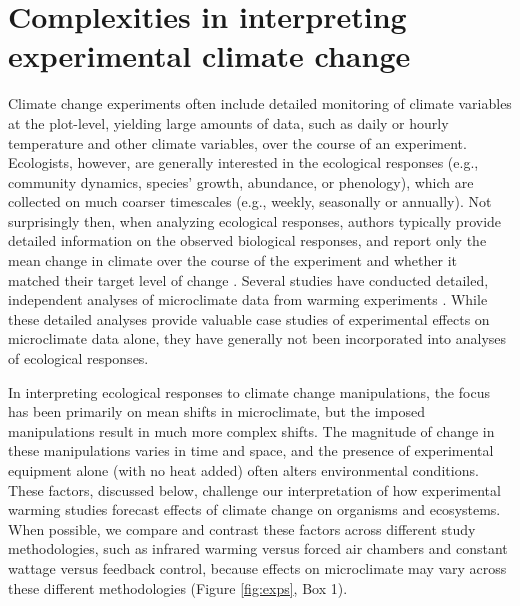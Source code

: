 \documentclass{article}
\begin{document}
\section* {Complexities in interpreting experimental climate change} 
Climate change experiments often include detailed monitoring of climate variables at the plot-level, yielding large amounts of data, such as daily or hourly temperature and other climate variables, over the course of an experiment. Ecologists, however, are generally interested in the ecological responses (e.g., community dynamics, species' growth, abundance, or phenology), which are collected on much coarser timescales (e.g., weekly, seasonally or annually). Not surprisingly then, when analyzing ecological responses, authors typically provide detailed information on the observed biological responses, and report only the mean change in climate over the course of the experiment and whether it matched their target level of change \citep[e.g.,][]{price1998,rollinson2012,clark2014a,clark2014b}. Several studies have conducted detailed, independent analyses of microclimate data from warming experiments \citep[e.g.,][]{harte1995b,kimball2005,kimball2008,mcdaniel2014, pelini2011}. While these detailed analyses provide valuable case studies of experimental effects on microclimate data alone, they have generally not been incorporated into analyses of ecological responses. 

\par In interpreting ecological responses to climate change manipulations, the focus has been primarily on mean shifts in microclimate, but the imposed manipulations result in much more complex shifts. The magnitude of change in these manipulations varies in time and space, and the presence of experimental equipment alone (with no heat added) often alters environmental conditions. These factors, discussed below, challenge our interpretation of how experimental warming studies forecast effects of climate change on organisms and ecosystems. When possible, we compare and contrast these factors across different study methodologies, such as infrared warming versus forced air chambers and constant wattage versus feedback control, because effects on microclimate may vary across these different methodologies (Figure \ref{fig:exps}, Box 1).
\end{document}
